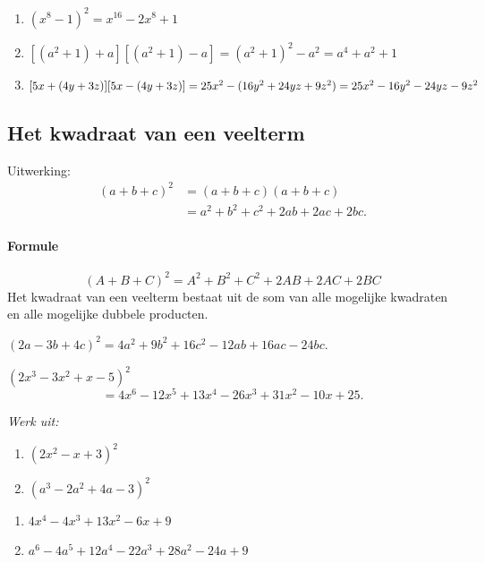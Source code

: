 \documentclass{bis}
\begin{document}
\begin{solution}
\begin{enumerate}
  \item \((x^8-1)^2=x^{16}-2x^8+1\)
  \item \([(a^2+1)+a][(a^2+1)-a]=(a^2+1)^2-a^2=a^4+a^2+1\)
  \item \([5x+(4y+3z)][5x-(4y+3z)]=25x^2-(16y^2+24yz+9z^2)\\=25x^2-16y^2-24yz-9z^2\)
\end{enumerate}
\end{solution}

\subsection{Het kwadraat van een veelterm}
Uitwerking:
\[
\begin{aligned}
(a+b+c)^2&=(a+b+c)(a+b+c)\\
&=a^2+b^2+c^2+2ab+2ac+2bc.
\end{aligned}
\]

\paragraph*{Formule}
\[
\boxed{(A+B+C)^2=A^2+B^2+C^2+2AB+2AC+2BC}
\]
Het kwadraat van een veelterm bestaat uit de som van alle mogelijke kwadraten en alle mogelijke dubbele producten.

\begin{voorbeeld}
\((2a-3b+4c)^2=4a^2+9b^2+16c^2-12ab+16ac-24bc\).
\end{voorbeeld}

\begin{voorbeeld}
\((2x^3-3x^2+x-5)^2\)
\[
=4x^6-12x^5+13x^4-26x^3+31x^2-10x+25.
\]
\end{voorbeeld}

\begin{exercise}
\emph{Werk uit:}
\begin{enumerate}
  \item \((2x^2-x+3)^2\)
  \item \((a^3-2a^2+4a-3)^2\)
\end{enumerate}
\end{exercise}

\begin{solution}
\begin{enumerate}
  \item \(4x^4-4x^3+13x^2-6x+9\)
  \item \(a^6-4a^5+12a^4-22a^3+28a^2-24a+9\)
\end{enumerate}
\end{solution}
\end{document}
